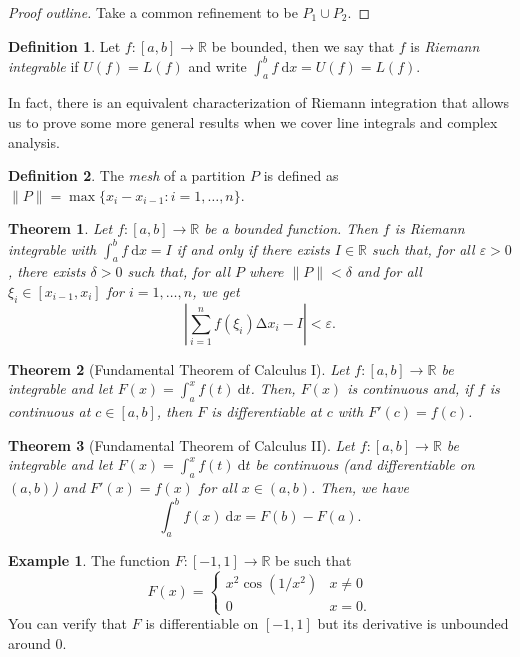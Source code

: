 \documentclass[letterpaper,12pt]{article}
\theoremstyle{definition}
\newtheorem{definition}{Definition}[section]
\newtheorem{example}{Example}[section]
\theoremstyle{plain}
\newtheorem{thm}{Theorem}[section]
\theoremstyle{remark}
\newcommand{\R}{\mathbb{R}}
\let\oldDelta\Delta
\renewcommand{\Delta}{\mathrm{\oldDelta}}
\begin{document}
\begin{proof}[Proof outline]
Take a common refinement to be $P_1\cup P_2$.
\end{proof}

\begin{definition}
Let $f:[a,b]\to \mathbb{R}$ be bounded, then we say that $f$ is \emph{Riemann integrable} if $U(f)=L(f)$ and write $\int_a^b f\ \mathrm{d}x = U(f)=L(f)$.
\end{definition}

In fact, there is an equivalent characterization of Riemann integration that allows us to prove some more general results when we cover line integrals and complex analysis.

\begin{definition}
The \emph{mesh} of a partition $P$ is defined as $\|P\| = \max\{x_i-x_{i-1}:i=1,\ldots,n\}$.
\end{definition}

\begin{thm}
Let $f:[a,b]\to \R$ be a bounded function. Then $f$ is Riemann integrable with $\int_a^b f\ \mathrm{d}x = I$ if and only if there exists $I\in \mathbb{R}$ such that, for all $\varepsilon>0$, there exists $\delta>0$ such that, for all $P$ where $\|P\|<\delta$ and for all $\xi_i\in[x_{i-1},x_i]$ for $i=1,\ldots,n$, we get
\[\left|\sum_{i=1}^{n}f(\xi_i)\Delta x_i-I\right|<\varepsilon.\]
\end{thm}

\begin{thm}[Fundamental Theorem of Calculus I]
Let $f:[a,b]\to \R$ be integrable and let $F(x) = \int_a^x f(t)\ \mathrm{d}t$. Then, $F(x)$ is continuous and, if $f$ is continuous at $c\in[a,b]$, then $F$ is differentiable at $c$ with $F'(c)=f(c)$.
\end{thm}

\begin{thm}[Fundamental Theorem of Calculus II]
Let $f:[a,b]\to \R$ be integrable and let $F(x) = \int_a^x f(t)\ \mathrm{d}t$ be continuous (and differentiable on $(a,b)$) and $F'(x)=f(x)$ for all $x\in(a,b)$. Then, we have
\[\int_a^b f(x)\ \mathrm{d}x = F(b)-F(a).\]
\end{thm}

\begin{example}
The function $F:[-1,1]\to\R$ be such that
\[
F(x) = \begin{cases}
x^2\cos(1/x^2)& x\neq 0 \\
0 & x=0.
\end{cases}
\]
You can verify that $F$ is differentiable on $[-1,1]$ but its derivative is unbounded around $0$.
\end{example}
\end{document}
